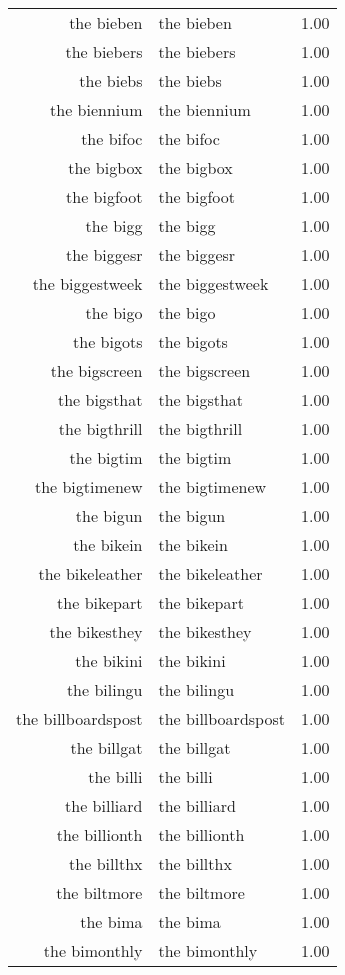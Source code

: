 \begin{table}[ht]
\begin{tabular}{rlr}
  the bieben & the bieben & 1.00 \\ 
  the biebers & the biebers & 1.00 \\ 
  the biebs & the biebs & 1.00 \\ 
  the biennium & the biennium & 1.00 \\ 
  the bifoc & the bifoc & 1.00 \\ 
  the bigbox & the bigbox & 1.00 \\ 
  the bigfoot & the bigfoot & 1.00 \\ 
  the bigg & the bigg & 1.00 \\ 
  the biggesr & the biggesr & 1.00 \\ 
  the biggestweek & the biggestweek & 1.00 \\ 
  the bigo & the bigo & 1.00 \\ 
  the bigots & the bigots & 1.00 \\ 
  the bigscreen & the bigscreen & 1.00 \\ 
  the bigsthat & the bigsthat & 1.00 \\ 
  the bigthrill & the bigthrill & 1.00 \\ 
  the bigtim & the bigtim & 1.00 \\ 
  the bigtimenew & the bigtimenew & 1.00 \\ 
  the bigun & the bigun & 1.00 \\ 
  the bikein & the bikein & 1.00 \\ 
  the bikeleather & the bikeleather & 1.00 \\ 
  the bikepart & the bikepart & 1.00 \\ 
  the bikesthey & the bikesthey & 1.00 \\ 
  the bikini & the bikini & 1.00 \\ 
  the bilingu & the bilingu & 1.00 \\ 
  the billboardspost & the billboardspost & 1.00 \\ 
  the billgat & the billgat & 1.00 \\ 
  the billi & the billi & 1.00 \\ 
  the billiard & the billiard & 1.00 \\ 
  the billionth & the billionth & 1.00 \\ 
  the billthx & the billthx & 1.00 \\ 
  the biltmore & the biltmore & 1.00 \\ 
  the bima & the bima & 1.00 \\ 
  the bimonthly & the bimonthly & 1.00 \\ 

\end{tabular}
\end{table}
